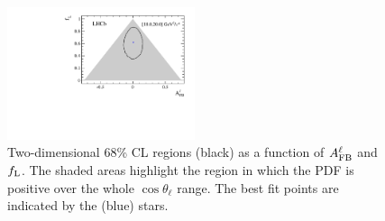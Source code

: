 \begin{figure}[h]
\includegraphics[width=0.49\textwidth]{Lmumu/figs/paper/figure10e.pdf}
\caption{Two-dimensional 68\% CL regions (black) as a
  function of $A_{\rm FB}^\ell$ and $f_{\rm L}$.  The shaded areas
  highlight the region in which the PDF is positive over the whole 
  $\cos \theta_{\ell}$ range. The best fit points are indicated by the (blue) stars. }
\label{fig:contours}
\end{figure}
